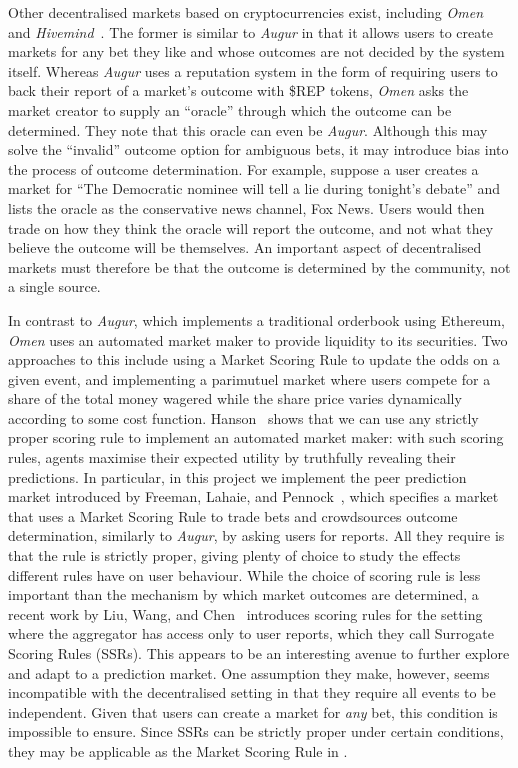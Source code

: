 Other decentralised markets based on cryptocurrencies exist, including
\emph{Omen}~\cite{Omen} and \emph{Hivemind}~\cite{Hivemind}. The former is
similar to \emph{Augur} in that it allows users to create markets for any bet
they like and whose outcomes are not decided by the system itself. Whereas
\emph{Augur} uses a reputation system in the form of requiring users to back
their report of a market's outcome with \$REP tokens, \emph{Omen} asks the
market creator to supply an ``oracle'' through which the outcome can be
determined. They note that this oracle can even be \emph{Augur}. Although this
may solve the ``invalid'' outcome option for ambiguous bets, it may introduce
bias into the process of outcome determination. For example, suppose a user
creates a market for ``The Democratic nominee will tell a lie during tonight's
debate'' and lists the oracle as the conservative news channel, Fox News. Users
would then trade on how they think the oracle will report the outcome, and not
what they believe the outcome will be themselves. An important aspect of
decentralised markets must therefore be that the outcome is determined by the
community, not a single source. 

In contrast to \emph{Augur}, which implements a traditional orderbook using
Ethereum, \emph{Omen} uses an automated market maker to provide liquidity to
its securities. Two approaches to this include using a Market Scoring Rule to
update the odds on a given event, and implementing a parimutuel market where
users compete for a share of the total money wagered while the share price
varies dynamically according to some cost function. Hanson~\cite{Hanson2003}
shows that we can use any strictly proper scoring rule to implement an
automated market maker: with such scoring rules, agents maximise their expected
utility by truthfully revealing their predictions. In particular, in this
project we implement the peer prediction market introduced by Freeman, Lahaie,
and Pennock~\cite{CODiPM}, which specifies a market that uses a Market Scoring
Rule to trade bets and crowdsources outcome determination, similarly to
\emph{Augur}, by asking users for reports. All they require is that the rule is
strictly proper, giving plenty of choice to study the effects different rules
have on user behaviour. While the choice of scoring rule is less important than
the mechanism by which market outcomes are determined, a recent work by Liu,
Wang, and Chen~\cite{Liu2020} introduces scoring rules for the setting where
the aggregator has access only to user reports, which they call Surrogate
Scoring Rules (SSRs). This appears to be an interesting avenue to further
explore and adapt to a prediction market. One assumption they make, however,
seems incompatible with the decentralised setting in that they require all
events to be independent.  Given that users can create a market for \emph{any}
bet, this condition is impossible to ensure. Since SSRs can be strictly proper
under certain conditions, they may be applicable as the Market Scoring Rule in
\cite{CODiPM}.


